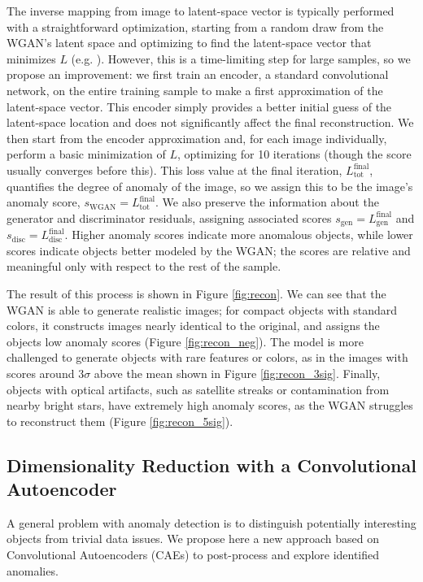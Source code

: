 The inverse mapping from image to latent-space vector is typically performed with a straightforward optimization, starting from a random draw from the WGAN's latent space and optimizing to find the latent-space vector that minimizes $L$ (e.g. \citealt{Schlegl2017}).
However, this is a time-limiting step for large samples, so we propose an improvement: we first train an encoder, a standard convolutional network, on the entire training sample to make a first approximation of the latent-space vector.
This encoder simply provides a better initial guess of the latent-space location and does not significantly affect the final reconstruction.
We then start from the encoder approximation and, for each image individually, perform a basic minimization of $L$, optimizing for 10 iterations (though the score usually converges before this).
This loss value at the final iteration, $L_\mathrm{tot}^\mathrm{final}$, quantifies the degree of anomaly of the image, so we assign this to be the image's anomaly score, $s_\mathrm{WGAN} = L_\mathrm{tot}^\mathrm{final}$.
We also preserve the information about the generator and discriminator residuals, assigning associated scores $s_\mathrm{gen} = L_\mathrm{gen}^\mathrm{final}$ and $s_\mathrm{disc} = L_\mathrm{disc}^\mathrm{final}$.
Higher anomaly scores indicate more anomalous objects, while lower scores indicate objects better modeled by the WGAN; the scores are relative and meaningful only with respect to the rest of the sample.

The result of this process is shown in Figure \ref{fig:recon}.
We can see that the WGAN is able to generate realistic images; for compact objects with standard colors, it constructs images nearly identical to the original, and assigns the objects low anomaly scores (Figure \ref{fig:recon_neg}).
The model is more challenged to generate objects with rare features or colors, as in the images with scores around $3\sigma$ above the mean shown in Figure \ref{fig:recon_3sig}.
Finally, objects with optical artifacts, such as satellite streaks or contamination from nearby bright stars, have extremely high anomaly scores, as the WGAN struggles to reconstruct them (Figure \ref{fig:recon_5sig}).

\subsection{Dimensionality Reduction with a Convolutional Autoencoder}
\label{sec:cae}

A general problem with anomaly detection is to distinguish potentially interesting objects from trivial data issues.  
We propose here a new approach based on Convolutional Autoencoders (CAEs) to post-process and explore identified anomalies.

